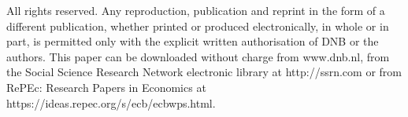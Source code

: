 \documentclass[11pt]{article}
\begin{document}
\noindent All rights reserved. Any reproduction, publication and reprint in the form of a different publication, whether printed or produced electronically, in whole or in part, is permitted only with the explicit written authorisation of DNB or the authors. This paper can be downloaded without charge from www.dnb.nl, from the Social Science Research Network electronic library at http://ssrn.com or from RePEc: Research Papers in Economics at https://ideas.repec.org/s/ecb/ecbwps.html.
\end{document}
